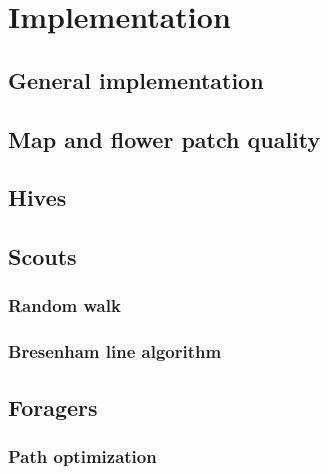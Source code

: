 \section{Implementation}
\subsection{General implementation}
\subsection{Map and flower patch quality}
\subsection{Hives}
\subsection{Scouts}
	\subsubsection{Random walk}
	\subsubsection{Bresenham line algorithm}
\subsection{Foragers}
	\subsubsection{Path optimization}
	